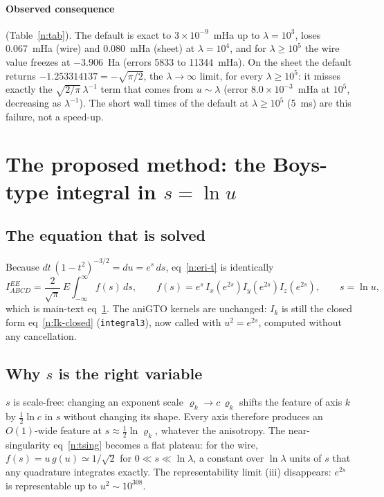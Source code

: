 \documentclass[11pt]{article}
\begin{document}
\paragraph{Observed consequence} (Table~\ref{n:tab}).  The default is exact to $3\times10^{-9}$~mHa up to
$\lambda=10^3$, loses 0.067~mHa (wire) and 0.080~mHa (sheet) at $\lambda=10^4$, and for $\lambda\ge10^5$ the wire
value freezes at $-3.906$~Ha (errors 5833 to 11344~mHa).  On the sheet the default returns
$-1.253314137=-\sqrt{\pi/2}$, the $\lambda\to\infty$ limit, for every $\lambda\ge10^5$: it misses exactly the
$\sqrt{2/\pi}\,\lambda^{-1}$ term that comes from $u\sim\lambda$ (error $8.0\times10^{-3}$~mHa at $10^5$, decreasing
as $\lambda^{-1}$).  The short wall times of the default at $\lambda\ge10^5$ (5~ms) are this failure, not a
speed-up.

\section{The proposed method: the Boys-type integral in $s=\ln u$}
\label{n:sec:proposed}
\subsection{The equation that is solved}
Because $dt\,(1-t^2)^{-3/2}=du=e^s\,ds$, eq~\ref{n:eri-t} is identically
\begin{equation}
I^{EE}_{ABCD}=\frac{2}{\sqrt\pi}\,E\int_{-\infty}^{\infty}f(s)\,ds,\qquad
f(s)=e^{s}\,I_x\!\left(e^{2s}\right)I_y\!\left(e^{2s}\right)I_z\!\left(e^{2s}\right),\qquad s=\ln u,
\label{n:logvar}
\end{equation}
which is main-text eq~\href{main.pdf\#equation.1}{1}.  The aniGTO kernels are unchanged: $I_k$ is still the closed form
eq~\ref{n:Ik-closed} (\texttt{integral3}), now called with $u^2=e^{2s}$, computed without any cancellation.

\subsection{Why $s$ is the right variable}
$s$ is scale-free: changing an exponent scale $\varrho_k\to c\,\varrho_k$ shifts the feature of axis $k$ by
$\tfrac12\ln c$ in $s$ without changing its shape.  Every axis therefore produces an $O(1)$-wide feature at
$s\approx\tfrac12\ln\varrho_k$, whatever the anisotropy.  The near-singularity eq~\ref{n:tsing} becomes a flat
plateau: for the wire, $f(s)=u\,g(u)\simeq1/\sqrt2$ for $0\ll s\ll\ln\lambda$, a constant over $\ln\lambda$ units
of $s$ that any quadrature integrates exactly.  The representability limit (iii) disappears: $e^{2s}$ is
representable up to $u^2\sim10^{308}$.
\end{document}
